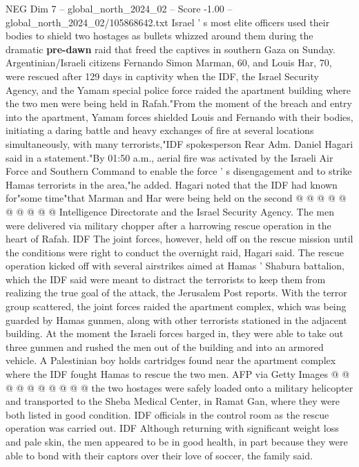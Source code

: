 \begin{textsample}{NEG Dim 7 – global\_north\_2024\_02 – Score -1.00 – global\_north\_2024\_02/105868642.txt}  \label{ex:f7_neg_427}
Israel ' s most elite officers used their bodies to shield two hostages as bullets whizzed around them during the dramatic \textbf{pre-dawn} raid that freed the captives in southern Gaza on Sunday.
Argentinian/Israeli citizens Fernando Simon Marman, 60, and Louis Har, 70, were rescued after 129 days in captivity when the IDF, the Israel Security Agency, and the Yamam special police force raided the apartment building where the two men were being held in Rafah."From the moment of the breach and entry into the apartment, Yamam forces shielded Louis and Fernando with their bodies, initiating a daring battle and heavy exchanges of fire at several locations simultaneously, with many terrorists,"IDF spokesperson Rear Adm.
Daniel Hagari said in a statement."By 01:50 a.m., aerial fire was activated by the Israeli Air Force and Southern Command to enable the force ' s disengagement and to strike Hamas terrorists in the area,"he added.
Hagari noted that the IDF had known for"some time"that Marman and Har were being held on the second @ @ @ @ @ @ @ @ @ @ Intelligence Directorate and the Israel Security Agency.
The men were delivered via military chopper after a harrowing rescue operation in the heart of Rafah.
IDF The joint forces, however, held off on the rescue mission until the conditions were right to conduct the overnight raid, Hagari said.
The rescue operation kicked off with several airstrikes aimed at Hamas ' Shabura battalion, which the IDF said were meant to distract the terrorists to keep them from realizing the true goal of the attack, the Jerusalem Post reports.
With the terror group scattered, the joint forces raided the apartment complex, which was being guarded by Hamas gunmen, along with other terrorists stationed in the adjacent building.
At the moment the Israeli forces barged in, they were able to take out three gunmen and rushed the men out of the building and into an armored vehicle.
A Palestinian boy holds cartridges found near the apartment complex where the IDF fought Hamas to rescue the two men.
AFP via Getty Images @ @ @ @ @ @ @ @ @ @ the two hostages were safely loaded onto a military helicopter and transported to the Sheba Medical Center, in Ramat Gan, where they were both listed in good condition.
IDF officials in the control room as the rescue operation was carried out.
IDF Although returning with significant weight loss and pale skin, the men appeared to be in good health, in part because they were able to bond with their captors over their love of soccer, the family said.

\end{textsample}
